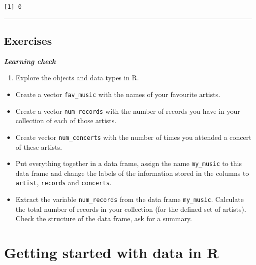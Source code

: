 \documentclass[
]{book}
\newenvironment{Shaded}{\begin{snugshade}}{\end{snugshade}}
\newcommand{\NormalTok}[1]{#1}
\newcommand{\OperatorTok}[1]{\textcolor[rgb]{0.81,0.36,0.00}{\textbf{#1}}}
\providecommand{\tightlist}{%
  \setlength{\itemsep}{0pt}\setlength{\parskip}{0pt}}
\begin{document}
\begin{Shaded}
\end{Shaded}

\begin{verbatim}
[1] 0
\end{verbatim}

\begin{center}\rule{0.5\linewidth}{0.5pt}\end{center}

\hypertarget{exercises}{%
\section{Exercises}\label{exercises}}

\textbf{\emph{Learning check}}

\begin{enumerate}
\def\labelenumi{\arabic{enumi}.}
\tightlist
\item
  Explore the objects and data types in R.
\end{enumerate}

\begin{itemize}
\tightlist
\item
  Create a vector \texttt{fav\_music} with the names of your favourite artists.
\item
  Create a vector \texttt{num\_records} with the number of records you have in your collection of each of those artists.
\item
  Create vector \texttt{num\_concerts} with the number of times you attended a concert of these artists.
\item
  Put everything together in a data frame, assign the name \texttt{my\_music} to this data frame and change the labels of the information stored in the columns to \texttt{artist}, \texttt{records} and \texttt{concerts}.
\item
  Extract the variable \texttt{num\_records} from the data frame \texttt{my\_music}. Calculate the total number of records in your collection (for the defined set of artists). Check the structure of the data frame, ask for a summary.
\end{itemize}

\hypertarget{started-with-data}{%
\chapter{Getting started with data in R}\label{started-with-data}}
\end{document}

